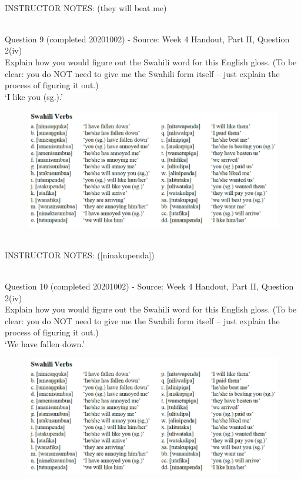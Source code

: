 \documentclass[12pt]{article}
\begin{document}
~\\
INSTRUCTOR NOTES: (they will beat me)


~\\

{\large Question 9} (completed 20201002) - Source: Week 4 Handout, Part II, Question 2(iv)\\

Explain how you would figure out the Swahili word for this English gloss. (To be clear: you do NOT need to give me the Swahili form itself -- just explain the process of figuring it out.)\\

‘I like you (sg.).’

\begin{figure}[H]
\includegraphics{../images/swahiliverbs.png}
\end{figure}

~\\
INSTRUCTOR NOTES: ([ninakupenda])


~\\

{\large Question 10} (completed 20201002) - Source: Week 4 Handout, Part II, Question 2(iv)\\

Explain how you would figure out the Swahili word for this English gloss. (To be clear: you do NOT need to give me the Swahili form itself -- just explain the process of figuring it out.)\\

‘We have fallen down.’

\begin{figure}[H]
\includegraphics{../images/swahiliverbs.png}
\end{figure}
\end{document}
